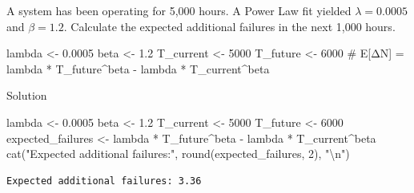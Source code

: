 \documentclass[
  letterpaper,
  DIV=11,
  numbers=noendperiod]{scrreprt}
\newenvironment{Shaded}{\begin{snugshade}}{\end{snugshade}}
\newcommand{\CommentTok}[1]{\textcolor[rgb]{0.37,0.37,0.37}{#1}}
\newcommand{\DecValTok}[1]{\textcolor[rgb]{0.68,0.00,0.00}{#1}}
\newcommand{\FloatTok}[1]{\textcolor[rgb]{0.68,0.00,0.00}{#1}}
\newcommand{\FunctionTok}[1]{\textcolor[rgb]{0.28,0.35,0.67}{#1}}
\newcommand{\NormalTok}[1]{\textcolor[rgb]{0.00,0.23,0.31}{#1}}
\newcommand{\OtherTok}[1]{\textcolor[rgb]{0.00,0.23,0.31}{#1}}
\newcommand{\SpecialCharTok}[1]{\textcolor[rgb]{0.37,0.37,0.37}{#1}}
\newcommand{\StringTok}[1]{\textcolor[rgb]{0.13,0.47,0.30}{#1}}
\begin{document}
\begin{tcolorbox}[enhanced jigsaw, arc=.35mm, bottomrule=.15mm, bottomtitle=1mm, breakable, colback=white, colbacktitle=quarto-callout-note-color!10!white, colframe=quarto-callout-note-color-frame, coltitle=black, left=2mm, leftrule=.75mm, opacityback=0, opacitybacktitle=0.6, rightrule=.15mm, title=\textcolor{quarto-callout-note-color}{\faInfo}\hspace{0.5em}{Try It}, titlerule=0mm, toprule=.15mm, toptitle=1mm]

A system has been operating for 5,000 hours. A Power Law fit yielded
\(\lambda = 0.0005\) and \(\beta = 1.2\). Calculate the expected
additional failures in the next 1,000 hours.

\begin{Shaded}
\begin{Highlighting}[]
\NormalTok{lambda    }\OtherTok{\textless{}{-}} \FloatTok{0.0005}
\NormalTok{beta      }\OtherTok{\textless{}{-}} \FloatTok{1.2}
\NormalTok{T\_current }\OtherTok{\textless{}{-}} \DecValTok{5000}
\NormalTok{T\_future  }\OtherTok{\textless{}{-}} \DecValTok{6000}
\CommentTok{\# E[ΔN] = lambda * T\_future\^{}beta {-} lambda * T\_current\^{}beta}
\end{Highlighting}
\end{Shaded}

Solution

\begin{Shaded}
\begin{Highlighting}[]
\NormalTok{lambda    }\OtherTok{\textless{}{-}} \FloatTok{0.0005}
\NormalTok{beta      }\OtherTok{\textless{}{-}} \FloatTok{1.2}
\NormalTok{T\_current }\OtherTok{\textless{}{-}} \DecValTok{5000}
\NormalTok{T\_future  }\OtherTok{\textless{}{-}} \DecValTok{6000}
\NormalTok{expected\_failures }\OtherTok{\textless{}{-}}\NormalTok{ lambda }\SpecialCharTok{*}\NormalTok{ T\_future}\SpecialCharTok{\^{}}\NormalTok{beta }\SpecialCharTok{{-}}\NormalTok{ lambda }\SpecialCharTok{*}\NormalTok{ T\_current}\SpecialCharTok{\^{}}\NormalTok{beta}
\FunctionTok{cat}\NormalTok{(}\StringTok{"Expected additional failures:"}\NormalTok{, }\FunctionTok{round}\NormalTok{(expected\_failures, }\DecValTok{2}\NormalTok{), }\StringTok{"}\SpecialCharTok{\textbackslash{}n}\StringTok{"}\NormalTok{)}
\end{Highlighting}
\end{Shaded}

\begin{verbatim}
Expected additional failures: 3.36 
\end{verbatim}

\end{tcolorbox}
\end{document}
